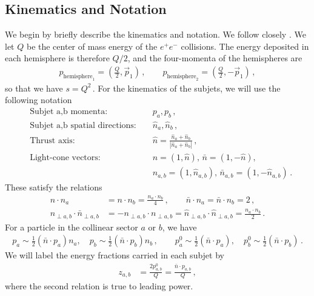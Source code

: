 \documentclass[a4paper,11pt]{article}
\begin{document}
\subsection{Kinematics and Notation}
We begin by briefly describe the kinematics and notation. We follow closely \cite{Larkoski:2015kga}.
We let $Q$ be the center of mass energy of the $e^+e^-$ collisions. The energy deposited in each hemisphere is therefore $Q/2$, and the four-momenta of the hemispheres are
\begin{align}
p_{\text{hemisphere}_1}=\left( \frac{Q}{2},\vec p_1   \right)\,, \qquad p_{\text{hemisphere}_2}=\left( \frac{Q}{2},-\vec p_1   \right)\,,
\end{align}
so that we have $s=Q^2\,.$ For the kinematics of the subjets, we will use the following notation
\begin{align}
&\text{Subjet a,b momenta: }& &p_a,p_b\,,\\
&\text{Subjet a,b spatial directions: }& &\hat{n}_{a}, \hat{n}_b\,,\\
&\text{Thrust axis: }& &\hat{n}=\frac{\hat{n}_{a}+ \hat{n}_b}{|\hat{n}_{a}+ \hat{n}_b|}\,,\\
&\text{Light-cone vectors: }& &n=(1,\hat{n}),\,\bar{n}=(1,-\hat{n}),\nonumber\\
& & &n_{a,b}=(1,\hat{n}_{a,b}),\,\bar{n}_{a,b}=(1,-\hat{n}_{a,b})\,.
\end{align}
These satisfy the relations
\begin{align} \label{eq:cs_kinematics1}
n\cdot n_a&=n\cdot n_b= \frac{n_a \cdot n_b}{4}\,, \qquad
%
\bar{n}\cdot n_a=\bar{n}\cdot n_b=2\,, \\
%
n_{\perp a,b}\cdot \bar{n}_{\perp a,b}&=-n_{\perp a,b}\cdot n_{\perp a,b}=\hat{n}_{\perp a,b}\cdot\hat{n}_{\perp a,b}=\frac{n_a\cdot n_b}{2}\,. \label{eq:cs_kinematics2}
\end{align}
For a particle in the collinear sector $a$ or $b$, we have
\begin{align}\label{energy_in_diverse_coor}
p_a\sim\frac{1}{2}(\bar{n}\cdot p_a) n_a,\quad p_b\sim\frac{1}{2}(\bar{n}\cdot p_b) n_b\,,\qquad
p_a^0\sim\frac{1}{2}(\bar{n}\cdot p_a),\quad p_b^0\sim\frac{1}{2}(\bar{n}\cdot p_b)\,.
\end{align}
We will label the energy fractions carried in each subjet by
\begin{align}\label{energy_fractions}
z_{a,b}&=\frac{2p_{a,b}^0}{Q}=\frac{\bar n\cdot p_{a,b}}{Q}\,,
\end{align}
where the second relation is true to leading power.
\end{document}
